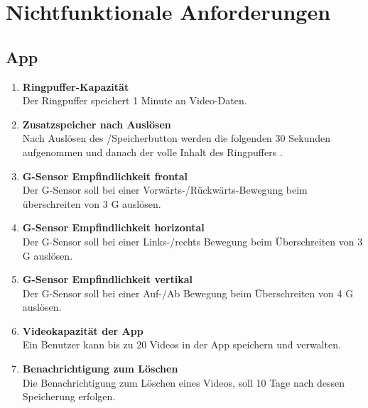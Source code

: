 \chapter{Nichtfunktionale Anforderungen}

\section{\gls{App}}
\begin{enumerate}
\renewcommand{\labelenumi}{\textbf{\theenumi}}
\renewcommand{\theenumi}{NA\arabic{enumi}0}
\setcounter{enumi}{99}
\item \label{na:Ringpuffer} \textbf{\gls{Ringpuffer}-Kapazität} \hfill\\ Der \gls{Ringpuffer} speichert 1 Minute an Video-Daten.

\item \textbf{Zusatzspeicher nach Auslösen} \hfill\\ Nach Auslösen des /Speicherbutton werden die folgenden 30 Sekunden aufgenommen und danach der volle Inhalt des Ringpuffers .

\item \label{na:GSensfront}\textbf{\gls{G-Sensor} Empfindlichkeit frontal} \hfill\\  Der \gls{G-Sensor} soll bei einer Vorwärts-/Rückwärts-Bewegung beim überschreiten von 3 G auslösen.

\item \textbf{\gls{G-Sensor} Empfindlichkeit horizontal} \hfill\\  Der \gls{G-Sensor} soll bei einer Links-/rechts Bewegung beim Überschreiten von 3 G auslösen.

\item \label{na:GSensvert}\textbf{\gls{G-Sensor} Empfindlichkeit vertikal} \hfill\\  Der \gls{G-Sensor} soll bei einer Auf-/Ab Bewegung beim Überschreiten von 4 G auslösen.

\item \textbf{Videokapazität der \gls{App}} \hfill\\  Ein Benutzer kann bis zu 20 Videos in der \gls{App} speichern und verwalten.

\item \textbf{Benachrichtigung zum Löschen} \hfill\\  Die Benachrichtigung zum Löschen eines Videos, soll 10 Tage nach dessen Speicherung erfolgen.
\end{enumerate}

